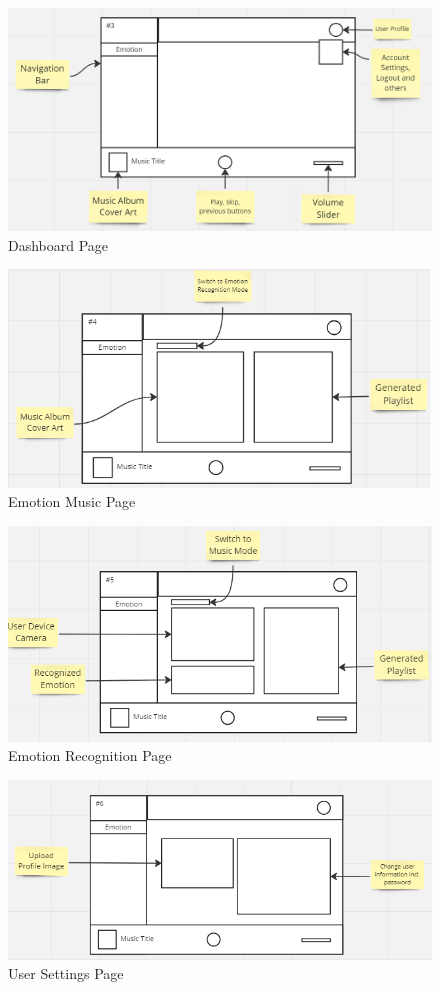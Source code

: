 \begin{figure}[H]
    \centering
    \includegraphics[width=12cm]{Images/overview.png}
    \caption{Dashboard Page}
    \label{fig:dashboard}
\end{figure}
\begin{figure}[H]
    \centering
    \includegraphics[width=12cm]{Images/emotion.png}
    \caption{Emotion Music Page}
    \label{fig:emotion}
\end{figure}
\begin{figure}[H]
    \centering
    \includegraphics[width=12cm]{Images/detection.png}
    \caption{Emotion Recognition Page}
    \label{fig:emotion-recog}
\end{figure}
\begin{figure}[H]
    \centering
    \includegraphics[width=12cm]{Images/user-settings.png}
    \caption{User Settings Page}
    \label{fig:usr-settings}
\end{figure}

